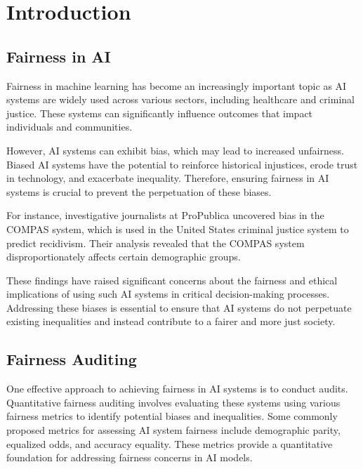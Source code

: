 \documentclass[manuscript,screen,review,anonymous]{acmart}
\begin{document}


\maketitle

\section{Introduction}


\subsection{Fairness in AI}

Fairness in machine learning has become an increasingly important topic as AI systems are widely used across various sectors, including healthcare and criminal justice. These systems can significantly influence outcomes that impact individuals and communities.

However, AI systems can exhibit bias, which may lead to increased unfairness. Biased AI systems have the potential to reinforce historical injustices, erode trust in technology, and exacerbate inequality. Therefore, ensuring fairness in AI systems is crucial to prevent the perpetuation of these biases.

For instance, investigative journalists at ProPublica uncovered bias in the COMPAS system, which is used in the United States criminal justice system to predict recidivism. Their analysis revealed that the COMPAS system disproportionately affects certain demographic groups.

These findings have raised significant concerns about the fairness and ethical implications of using such AI systems in critical decision-making processes. Addressing these biases is essential to ensure that AI systems do not perpetuate existing inequalities and instead contribute to a fairer and more just society.

\subsection{Fairness Auditing}

One effective approach to achieving fairness in AI systems is to conduct audits. Quantitative fairness auditing involves evaluating these systems using various fairness metrics to identify potential biases and inequalities. Some commonly proposed metrics for assessing AI system fairness include demographic parity, equalized odds, and accuracy equality. These metrics provide a quantitative foundation for addressing fairness concerns in AI models.
\end{document}
